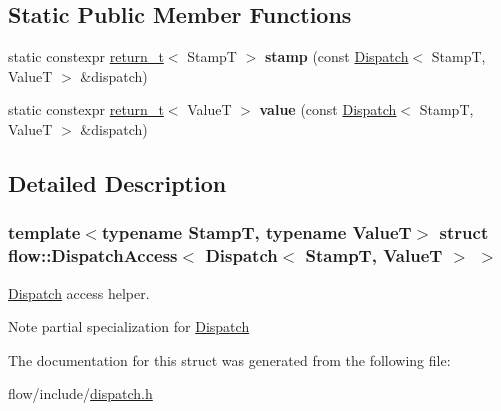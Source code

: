 \subsection*{Static Public Member Functions}
\begin{DoxyCompactItemize}
\item 
\mbox{\label{structflow_1_1_dispatch_access_3_01_dispatch_3_01_stamp_t_00_01_value_t_01_4_01_4_a80c6dd49fb16b22039e0eb9c31940d4a}} 
static constexpr \hyperlink{structflow_1_1_dispatch_access_3_01_dispatch_3_01_stamp_t_00_01_value_t_01_4_01_4_a36d7ab14d5fde88b9d255944db634f47}{return\+\_\+t}$<$ StampT $>$ {\bfseries stamp} (const \hyperlink{classflow_1_1_dispatch}{Dispatch}$<$ StampT, ValueT $>$ \&dispatch)
\item 
\mbox{\label{structflow_1_1_dispatch_access_3_01_dispatch_3_01_stamp_t_00_01_value_t_01_4_01_4_af50ba9de76aea596bbd557dcdfcd00dc}} 
static constexpr \hyperlink{structflow_1_1_dispatch_access_3_01_dispatch_3_01_stamp_t_00_01_value_t_01_4_01_4_a36d7ab14d5fde88b9d255944db634f47}{return\+\_\+t}$<$ ValueT $>$ {\bfseries value} (const \hyperlink{classflow_1_1_dispatch}{Dispatch}$<$ StampT, ValueT $>$ \&dispatch)
\end{DoxyCompactItemize}


\subsection{Detailed Description}
\subsubsection*{template$<$typename StampT, typename ValueT$>$\newline
struct flow\+::\+Dispatch\+Access$<$ Dispatch$<$ Stamp\+T, Value\+T $>$ $>$}

\hyperlink{classflow_1_1_dispatch}{Dispatch} access helper. 

\begin{DoxyNote}{Note}
partial specialization for \hyperlink{classflow_1_1_dispatch}{Dispatch} 
\end{DoxyNote}


The documentation for this struct was generated from the following file\+:\begin{DoxyCompactItemize}
\item 
flow/include/\hyperlink{dispatch_8h}{dispatch.\+h}\end{DoxyCompactItemize}
